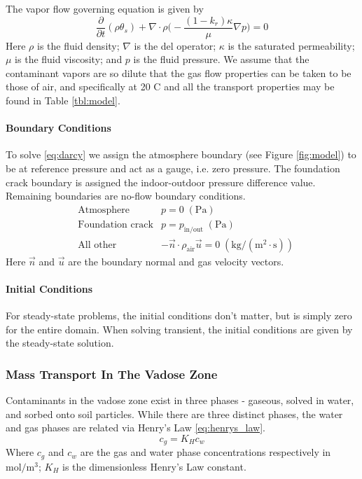 The vapor flow governing equation is given by
\begin{equation}\label{eq:darcy}
  \frac{\partial}{\partial t} (\rho \theta_s) + \nabla \cdot \rho \Big( -\frac{(1-k_r) \kappa}{\mu} \nabla p \Big) = 0
\end{equation}
Here $\rho$ is the fluid density;
$\nabla$ is the del operator;
$\kappa$ is the saturated permeability;
$\mu$ is the fluid viscosity; and $p$ is the fluid pressure.
We assume that the contaminant vapors are so dilute that the gas flow properties can be taken to be those of air, and specifically at 20 \degree C and all the transport properties may be found in Table \ref{tbl:model}.\par

\paragraph{Boundary Conditions}

To solve \eqref{eq:darcy} we assign the atmosphere boundary (see Figure \ref{fig:model}) to be at reference pressure and act as a gauge, i.e. zero pressure.
The foundation crack boundary is assigned the indoor-outdoor pressure difference value.
Remaining boundaries are no-flow boundary conditions.
\begin{align}
  &\text{Atmosphere} &p = 0 \; \mathrm{(Pa)} \\
  &\text{Foundation crack} &p = p_\mathrm{in/out} \; \mathrm{(Pa)} \\
  &\text{All other} &-\vec{n}\cdot\rho_\mathrm{air}\vec{u} = 0 \; \mathrm{(kg/(m^2\cdot s))}
\end{align}
Here $\vec{n}$ and $\vec{u}$ are the boundary normal and gas velocity vectors.

\paragraph{Initial Conditions}

For steady-state problems, the initial conditions don't matter, but is simply zero for the entire domain.
When solving transient, the initial conditions are given by the steady-state solution.\par

\subsubsection{Mass Transport In The Vadose Zone}\label{sec:mass_transport}

Contaminants in the vadose zone exist in three phases - gaseous, solved in water, and sorbed onto soil particles.
While there are three distinct phases, the water and gas phases are related via Henry's Law \eqref{eq:henrys_law}.
\begin{equation}\label{eq:henrys_law}
  c_g = K_H c_w
\end{equation}
Where $c_g$ and $c_w$ are the gas and water phase concentrations respectively in $\mathrm{mol/m^3}$;
$K_H$ is the dimensionless Henry's Law constant.\par

